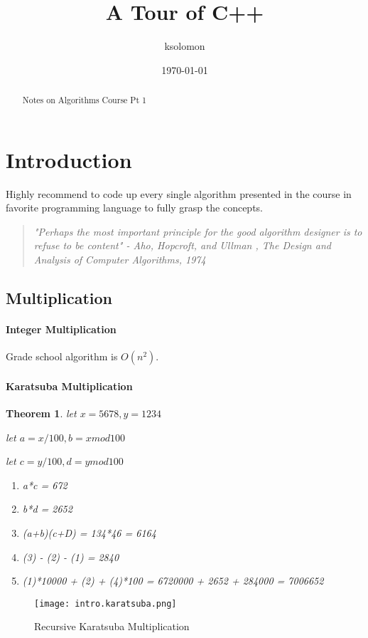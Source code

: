 \documentclass[a4paper, 10pt]{article}
\title{A Tour of C++}
\author{ksolomon}
\date{\today}
\begin{document}
\maketitle

\begin{abstract}
	Notes on Algorithms Course Pt 1
\end{abstract}



\section{Introduction}
Highly recommend to code up every single algorithm presented in the course in favorite programming language to fully grasp the concepts.
\begin{quote}
	\centering
	\textit{"Perhaps the most important principle for the good algorithm designer is to refuse to be content" - Aho, Hopcroft, and Ullman , The Design and Analysis of Computer Algorithms, 1974}
\end{quote}
\subsection{Multiplication}
\paragraph{Integer Multiplication}
Grade school algorithm is $O(n^2)$.
\paragraph{Karatsuba Multiplication}
\newtheorem{theorem}{Theorem}
\begin{theorem}
	let \(x = 5678, y = 1234\)

	let \(a = x / 100, b = x mod 100\)

	let \(c = y / 100, d = y mod 100\)
	\begin{enumerate}
		\item a*c = 672
		\item b*d = 2652
		\item (a+b)(c+D) = 134*46 = 6164
		\item (3) - (2) - (1) = 2840
		\item (1)*10000 + (2) + (4)*100 = 6720000 + 2652 + 284000 = 7006652
	\end{enumerate}
\end{theorem}
\begin{figure}[ht]
	\centering
	\texttt{[image: intro.karatsuba.png]}
	\caption{Recursive Karatsuba Multiplication}
\end{figure}
\end{document}
